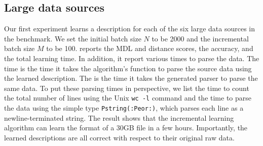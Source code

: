 \subsection{Large data sources}

Our first experiment learns a description for each of the six large data sources in the benchmark.  
We set the initial batch size $N$ to be 2000 and the incremental batch size $M$ to be 100.
 reports the MDL and distance scores, the accuracy, and the total learning time.
In addition, it report various times to parse the data.
The  time is the time it takes
the algorithm's  function to parse the source data using the
learned description. The  is the time it takes the generated \pads{}
parser to parse the same data. To put these parsing times in perspective,
we list the time to count the total number of lines using 
the Unix {\tt wc -l} command and the time to parse the data using
the simple \pads{} type {\tt Pstring(:Peor:)}, which parses each line as a newline-terminated string.
The result shows that the incremental
learning algorithm can learn the format of a 30GB file in a few hours.  Importantly,
the learned descriptions are all correct with respect to their original
raw data.


